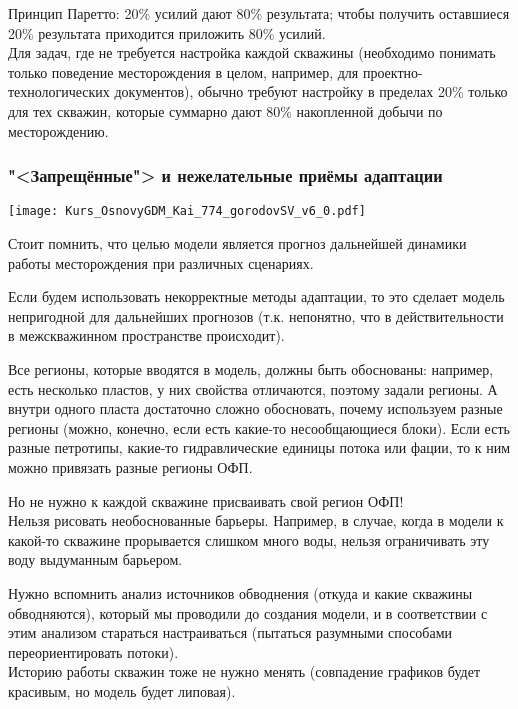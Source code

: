 \documentclass[main.tex]{subfiles}
\begin{document}
Принцип Паретто: 20\% усилий дают 80\% результата; чтобы получить оставшиеся 20\% результата приходится приложить 80\% усилий.\\

Для задач, где не требуется настройка каждой скважины (необходимо понимать только поведение месторождения в целом, например, для проектно-технологических документов), обычно требуют настройку в пределах 20\% только для тех скважин, которые суммарно дают 80\% накопленной добычи по месторождению. 

\subsubsection{"<Запрещённые"> и нежелательные приёмы адаптации}

\texttt{[image: Kurs\_OsnovyGDM\_Kai\_774\_gorodovSV\_v6\_0.pdf]}

Стоит помнить, что целью модели является прогноз дальнейшей динамики работы месторождения при различных сценариях.

Если будем использовать некорректные методы адаптации, то это сделает модель непригодной для дальнейших прогнозов (т.к. непонятно, что в действительности в межскважинном пространстве происходит).

Все регионы, которые вводятся в модель, должны быть обоснованы: например, есть несколько пластов, у них свойства отличаются, поэтому задали регионы. А внутри одного пласта достаточно сложно обосновать, почему используем разные регионы (можно, конечно, если есть какие-то несообщающиеся блоки).
Если есть разные петротипы, какие-то гидравлические единицы потока или фации, то к ним можно привязать разные регионы ОФП.

Но не нужно к каждой скважине присваивать свой регион ОФП!
\\

Нельзя рисовать необоснованные барьеры.
Например, в случае, когда в модели к какой-то скважине прорывается слишком много воды, нельзя ограничивать эту воду выдуманным барьером.

Нужно вспомнить анализ источников обводнения (откуда и какие скважины обводняются), который мы проводили до создания модели, и в соответствии с этим анализом стараться настраиваться (пытаться разумными способами переориентировать потоки).
\\

Историю работы скважин тоже не нужно менять (совпадение графиков будет красивым, но модель будет липовая).
\\
\end{document}
